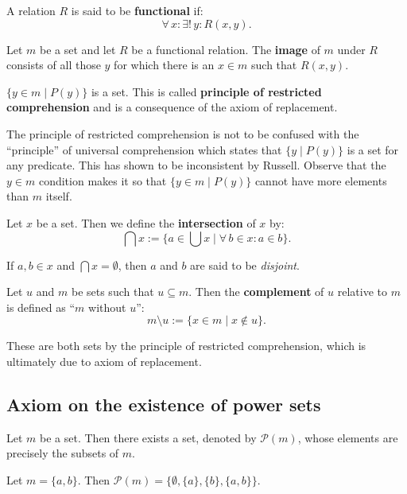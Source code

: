 \documentclass[root.tex]{subfiles}
\begin{document}
\begin{mydef}
A relation $R$ is said to be \textbf{functional} if:
$$
\forall \, x : \exists ! \, y : R(x,y) .
$$
\end{mydef}

\begin{mydef}
  Let $m$ be a set and let $R$ be a functional relation. The \textbf{image} of $m$ under $R$ consists of all those $y$ for which there is an $x\in m$ such that $R(x,y)$. 
\end{mydef}

\begin{theorem}
  $\{y \in m \mid P(y)\}$ is a set. This is called \textbf{principle of restricted comprehension} and is a consequence of the axiom of replacement.
\end{theorem}

The principle of restricted comprehension is not to be confused with the ``principle'' of universal comprehension which states that $\{y \mid P(y)\} $ is a set for any predicate. This has shown to be inconsistent by Russell. Observe that the $y \in m$ condition makes it so that $\{y \in m \mid P(y)\}$ cannot have more elements than $m$ itself.


\begin{mydef}
  Let $x$ be a set. Then we define the \textbf{intersection} of $x$ by:
  $$
  \bigcap x := \{ a \in \bigcup x \mid \forall \, b \in x : a \in b \}.
  $$
\end{mydef}
If $a,b\in x$ and $\bigcap x = \emptyset$, then $a$ and $b$ are said to be \emph{disjoint}.

\begin{mydef}
  Let $u$ and $m$ be sets such that $u \subseteq m$. Then the \textbf{complement} of $u$ relative to $m$ is defined as ``$m$ without $u$'':
  $$
  m\setminus u := \{x \in m \mid x \notin u\}.
  $$
\end{mydef}

These are both sets by the principle of restricted comprehension, which is ultimately due to axiom of replacement.
\subsection{Axiom on the existence of power sets}
Let $m$ be a set. Then there exists a set, denoted by $\mathcal{P}(m)$, whose elements are precisely the subsets of $m$.

\begin{myex}
  Let $m = \{a,b\}$. Then $\mathcal{P}(m)=\{\emptyset,\{a\},\{b\},\{a,b\}\}$.
\end{myex}
\end{document}
